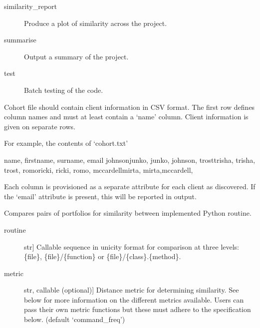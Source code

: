 \documentclass[letterpaper,10pt,english]{sphinxmanual}
\begin{document}
\begin{fulllineitems}
\begin{description}
\item[{similarity\_report}] \leavevmode
Produce a plot of similarity across the project.

\item[{summarise}] \leavevmode
Output a summary of the project.

\item[{test}] \leavevmode
Batch testing of the code.

\end{description}

Cohort file should contain client information in CSV format. The first row
defines column names and must at least contain a ‘name’ column. Client information
is given on separate rows.

For example, the contents of ‘cohort.txt’

name, firstname, surname, email
johnsonjunko, junko, johnson, 
trosttrisha, trisha, trost, 
romoricki, ricki, romo, 
mccardellmirta, mirta,mccardell, 

Each column is provisioned as a separate attribute for each client as discovered. If the
‘email’ attribute is present, this will be reported in output.

\begin{fulllineitems}
\label{\detokenize{index:unicity.Project.compare}}
Compares pairs of portfolios for similarity between implemented Python routine.
\begin{description}
\item[{routine}] \leavevmode{[}str{]}
Callable sequence in unicity format for comparison at three levels: \{file\}, 
\{file\}/\{function\} or \{file\}/\{class\}.\{method\}.

\item[{metric}] \leavevmode{[}str, callable (optional){]}
Distance metric for determining similarity. See below for more information on
the different metrics available. Users can pass their own metric functions but
these must adhere to the specification below. (default ‘command\_freq’)


\end{description}
\end{fulllineitems}
\end{fulllineitems}
\end{document}
